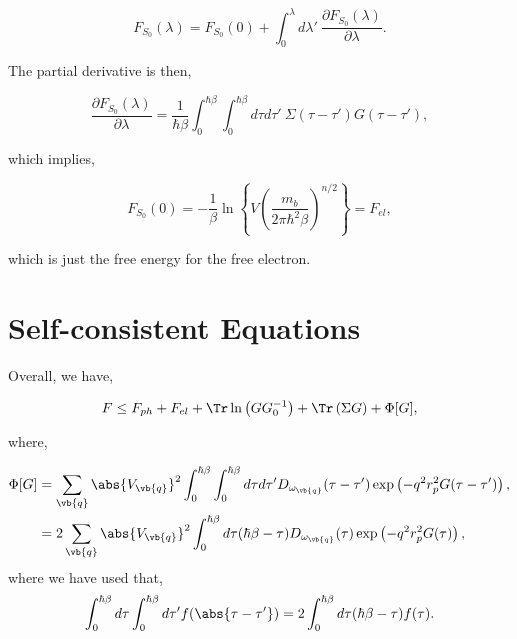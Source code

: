\begin{equation}
    F_{S_0}(\lambda) = F_{S_0}(0) + \int_0^\lambda d\lambda'\ \frac{\partial F_{S_0}(\lambda)}{\partial \lambda}.
\end{equation}

The partial derivative is then,

\begin{equation}
    \frac{\partial F_{S_0}(\lambda)}{\partial \lambda} = \frac{1}{\hbar\beta} \int_0^{\hbar\beta} \int_0^{\hbar\beta} d\tau d\tau'\ \Sigma(\tau - \tau') G(\tau - \tau'),
\end{equation}

which implies,

\begin{equation}
    F_{S_0}(0) = -\frac{1}{\beta} \ln\left\{V \left( \frac{m_b}{2 \pi \hbar^2 \beta} \right)^{n/2}\right\} = F_{el},
\end{equation}

which is just the free energy for the free electron.

\section{Self-consistent Equations}

Overall, we have,

\begin{equation}
    F \leq F_{ph} + F_{el} + \Tr \ln \left(G G_0^{-1}\right)   + \Tr \left( \Sigma G \right) + \Phi[G],
\end{equation}

where, 

\begin{equation}
    \begin{aligned}
        \Phi[G] &= \sum_{\vb{q}} \abs{V_{\vb{q}}}^2 \int_{0}^{\hbar\beta} \int_0^{\hbar\beta} d\tau d\tau' D_{\omega_{\vb{q}}}(\tau - \tau') \exp \left( -q^2 r_p^2 G(\tau - \tau') \right) ,\\
        &= 2 \sum_{\vb{q}} \abs{V_{\vb{q}}}^2 \int_0^{\hbar\beta}  d\tau (\hbar \beta - \tau) D_{\omega_{\vb{q}}} (\tau) \exp\left(-q^2 r_p^2 G(\tau)\right),
    \end{aligned}
\end{equation}
where we have used that,
\begin{equation}
    \int_0^{\hbar\beta} d\tau \int_0^{\hbar\beta} d\tau' f(\abs{\tau - \tau'}) = 2 \int_0^{\hbar\beta} d\tau (\hbar\beta - \tau) f(\tau).
\end{equation}

